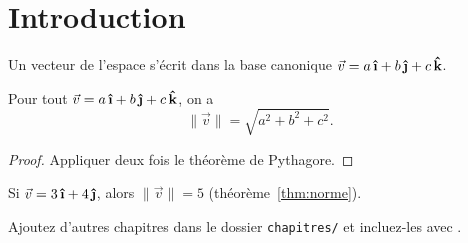 \chapter{Introduction}
\label{chap:introduction}

\begin{definition}
  Un vecteur de l’espace s’écrit dans la base canonique
  $\vec{v} = a\,\ihat + b\,\jhat + c\,\khat$.
\end{definition}

\begin{theoreme}
  \label{thm:norme}
  Pour tout $\vec{v} = a\,\ihat + b\,\jhat + c\,\khat$, on a
  \[
    \lVert \vec{v} \rVert = \sqrt{a^2 + b^2 + c^2}.
  \]
\end{theoreme}

\begin{proof}
  Appliquer deux fois le théorème de Pythagore.
\end{proof}

\begin{exemple}
  Si $\vec{v} = 3\,\ihat + 4\,\jhat$, alors $\lVert \vec{v} \rVert = 5$
  (théorème~\ref{thm:norme}).
\end{exemple}

\begin{remarque}
  Ajoutez d’autres chapitres dans le dossier \texttt{chapitres/} et incluez-les avec \verb||.
\end{remarque}
